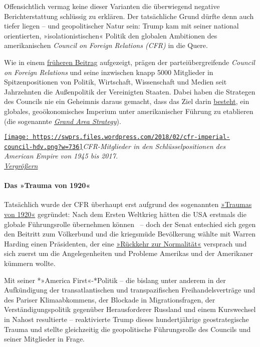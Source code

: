 Offensichtlich vermag keine dieser Varianten die überwiegend negative
Berichterstattung schlüssig zu erklären. Der tatsächliche Grund dürfte
denn auch tiefer liegen -- und geopolitischer Natur sein: Trump kam mit
seiner national orientierten, »isolationistischen« Politik den globalen
Ambitionen des amerikanischen \emph{Council on Foreign Relations (CFR)}
in die Quere.

Wie in einem
\href{https://swprs.org/das-american-empire-und-seine-medien/}{früheren
Beitrag} aufgezeigt, prägen der parteiübergreifende \emph{Council on
Foreign Relations} und seine inzwischen knapp 5000 Mitglieder in
Spitzenpositionen von Politik, Wirtschaft, Wissenschaft und Medien seit
Jahrzehnten die Außenpolitik der Vereinigten Staaten. Dabei haben die
Strategen des Councils nie ein Geheimnis daraus gemacht, dass das Ziel
darin
\href{https://www.amazon.de/Die-einzige-Weltmacht-Strategie-Vorherrschaft/dp/3596143586}{besteht},
ein globales, geoökonomisches Imperium unter amerikanischer Führung zu
etablieren (die sogenannte
\href{https://swprs.files.wordpress.com/2017/09/domhoff-cfr-2014.pdf}{\emph{Grand
Area Strategy}}).

\href{https://swprs.files.wordpress.com/2018/02/cfr-imperial-council-hdv.png}{\texttt{[image: https://swprs.files.wordpress.com/2018/02/cfr-imperial-council-hdv.png?w=736]}}\emph{CFR-Mitglieder
in den Schlüsselpositionen des American Empire von 1945 bis 2017.\\
\href{https://swprs.files.wordpress.com/2018/02/cfr-imperial-council-hdv.png}{Vergrößern}}
🔎

\hypertarget{das-trauma-von-1920}{%
\paragraph{Das »Trauma von 1920«}\label{das-trauma-von-1920}}

Tatsächlich wurde der CFR überhaupt erst aufgrund des sogenannten
\href{http://www.spiegel.de/spiegel/print/d-41389590.html}{»Traumas von
1920«} gegründet: Nach dem Ersten Weltkrieg hätten die USA erstmals die
globale Führungsrolle übernehmen können ~-- doch der Senat entschied
sich gegen den Beitritt zum Völkerbund und die kriegsmüde Bevölkerung
wählte mit Warren Harding einen Präsidenten, der eine
\href{https://en.wikipedia.org/wiki/Return_to_normalcy}{»Rückkehr zur
Normalität«} versprach und sich zuerst um die Angelegenheiten und
Probleme Amerikas und der Amerikaner kümmern wollte.

Mit seiner *»America First«-*Politik -- die bislang unter anderem in der
Aufkündigung der transatlantischen und transpazifischen
Freihandelsverträge und des Pariser Klimaabkommens, der Blockade in
Migrationsfragen, der Verständigungspolitik gegenüber Herausforderer
Russland und einem Kurswechsel in Nahost resultierte -- reaktivierte
Trump dieses hundertjährige geostrategische Trauma und stellte
gleichzeitig die geopolitische Führungsrolle des Councils und seiner
Mitglieder in Frage.

